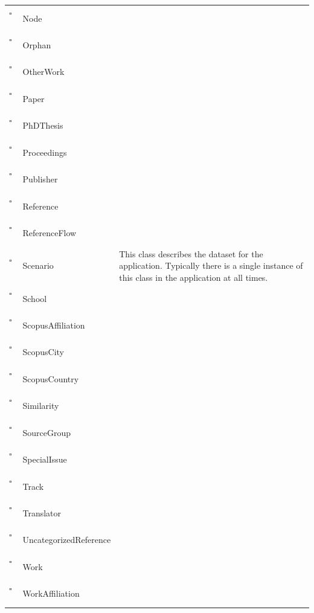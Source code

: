 \begin{longtable}{llp{8cm}}
$\square$\ & Node &  \\
$\square$\ & Orphan &  \\
$\square$\ & OtherWork &  \\
$\square$\ & Paper &  \\
$\square$\ & PhDThesis &  \\
$\square$\ & Proceedings &  \\
$\square$\ & Publisher &  \\
$\square$\ & Reference &  \\
$\square$\ & ReferenceFlow &  \\
$\square$\ & Scenario & This class describes the dataset for the application. Typically there is a single instance of this class in the application at all times. \\
$\square$\ & School &  \\
$\square$\ & ScopusAffiliation &  \\
$\square$\ & ScopusCity &  \\
$\square$\ & ScopusCountry &  \\
$\square$\ & Similarity &  \\
$\square$\ & SourceGroup &  \\
$\square$\ & SpecialIssue &  \\
$\square$\ & Track &  \\
$\square$\ & Translator &  \\
$\square$\ & UncategorizedReference &  \\
$\square$\ & Work &  \\
$\square$\ & WorkAffiliation &  \\
\end{longtable}
